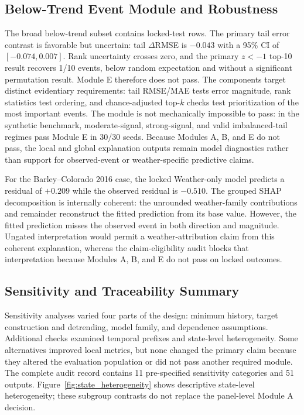 \documentclass[conference]{IEEEtran}
\begin{document}
\subsection{Below-Trend Event Module and Robustness}
The broad below-trend subset contains \AuditTailRows{} locked-test rows. The
primary tail error contrast is favorable but uncertain: tail $\Delta$RMSE is
$-0.043$ with a 95\% CI of $[-0.074,0.007]$. Rank uncertainty crosses zero, and
the primary $z<-1$ top-10 result recovers 1/10 events, below random expectation
and without a significant permutation result. Module E therefore does not pass.
The components target distinct evidentiary requirements: tail RMSE/MAE tests
error magnitude, rank statistics test ordering, and chance-adjusted top-$k$
checks test prioritization of the most important events. The module is not
mechanically impossible to pass: in the synthetic benchmark, moderate-signal,
strong-signal, and valid imbalanced-tail regimes pass Module E in 30/30 seeds.
Because Modules A, B, and E do not pass, the local and global explanation outputs
remain model diagnostics rather than support for observed-event or
weather-specific predictive claims.

For the Barley--Colorado 2016 case, the locked Weather-only model predicts a
residual of $+0.209$ while the observed residual is $-0.510$. The grouped SHAP
decomposition is internally coherent: the unrounded weather-family contributions
and remainder reconstruct the fitted prediction from its base value. However, the fitted
prediction misses the observed event in both direction and magnitude. Ungated
interpretation would permit a weather-attribution claim from this coherent
explanation, whereas the claim-eligibility audit blocks that interpretation
because Modules A, B, and E do not pass on locked outcomes.

\subsection{Sensitivity and Traceability Summary}
Sensitivity analyses varied four parts of the design: minimum history, target
construction and detrending, model family, and dependence assumptions. Additional
checks examined temporal prefixes and state-level heterogeneity. Some
alternatives improved local metrics, but none changed the primary claim because
they altered the evaluation population or did not pass another required module. The
complete audit record contains 11 pre-specified sensitivity categories and 51
outputs.
Figure~\ref{fig:state_heterogeneity} shows descriptive state-level heterogeneity;
these subgroup contrasts do not replace the panel-level Module A decision.
\end{document}
